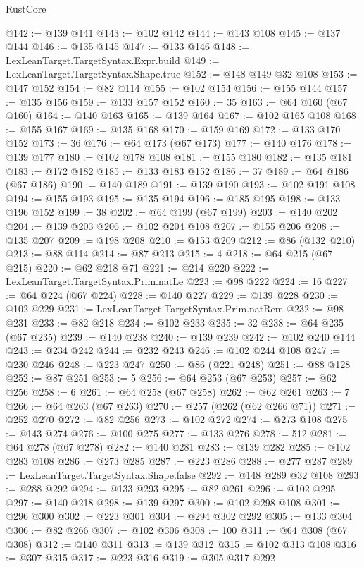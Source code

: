 \begin{lexlean}{RustCore}
\begin{coremodule}
@142 := @139 @141
@143 := @102 @142
@144 := @143 @108
@145 := @137 @144
@146 := @135 @145
@147 := @133 @146
@148 := LexLeanTarget.TargetSyntax.Expr.build
@149 := LexLeanTarget.TargetSyntax.Shape.true
@152 := @148 @149 @32 @108
@153 := @147 @152
@154 := @82 @114
@155 := @102 @154
@156 := @155 @144
@157 := @135 @156
@159 := @133 @157 @152
@160 := 35
@163 := @64 @160 (@67 @160)
@164 := @140 @163
@165 := @139 @164
@167 := @102 @165 @108
@168 := @155 @167
@169 := @135 @168
@170 := @159 @169
@172 := @133 @170 @152
@173 := 36
@176 := @64 @173 (@67 @173)
@177 := @140 @176
@178 := @139 @177
@180 := @102 @178 @108
@181 := @155 @180
@182 := @135 @181
@183 := @172 @182
@185 := @133 @183 @152
@186 := 37
@189 := @64 @186 (@67 @186)
@190 := @140 @189
@191 := @139 @190
@193 := @102 @191 @108
@194 := @155 @193
@195 := @135 @194
@196 := @185 @195
@198 := @133 @196 @152
@199 := 38
@202 := @64 @199 (@67 @199)
@203 := @140 @202
@204 := @139 @203
@206 := @102 @204 @108
@207 := @155 @206
@208 := @135 @207
@209 := @198 @208
@210 := @153 @209
@212 := @86 (@132 @210)
@213 := @88 @114
@214 := @87 @213
@215 := 4
@218 := @64 @215 (@67 @215)
@220 := @62 @218 @71
@221 := @214 @220
@222 := LexLeanTarget.TargetSyntax.Prim.natLe
@223 := @98 @222
@224 := 16
@227 := @64 @224 (@67 @224)
@228 := @140 @227
@229 := @139 @228
@230 := @102 @229
@231 := LexLeanTarget.TargetSyntax.Prim.natRem
@232 := @98 @231
@233 := @82 @218
@234 := @102 @233
@235 := 32
@238 := @64 @235 (@67 @235)
@239 := @140 @238
@240 := @139 @239
@242 := @102 @240 @144
@243 := @234 @242
@244 := @232 @243
@246 := @102 @244 @108
@247 := @230 @246
@248 := @223 @247
@250 := @86 (@221 @248)
@251 := @88 @128
@252 := @87 @251
@253 := 5
@256 := @64 @253 (@67 @253)
@257 := @62 @256
@258 := 6
@261 := @64 @258 (@67 @258)
@262 := @62 @261
@263 := 7
@266 := @64 @263 (@67 @263)
@270 := @257 (@262 (@62 @266 @71))
@271 := @252 @270
@272 := @82 @256
@273 := @102 @272
@274 := @273 @108
@275 := @143 @274
@276 := @100 @275
@277 := @133 @276
@278 := 512
@281 := @64 @278 (@67 @278)
@282 := @140 @281
@283 := @139 @282
@285 := @102 @283 @108
@286 := @273 @285
@287 := @223 @286
@288 := @277 @287
@289 := LexLeanTarget.TargetSyntax.Shape.false
@292 := @148 @289 @32 @108
@293 := @288 @292
@294 := @133 @293
@295 := @82 @261
@296 := @102 @295
@297 := @140 @218
@298 := @139 @297
@300 := @102 @298 @108
@301 := @296 @300
@302 := @223 @301
@304 := @294 @302 @292
@305 := @133 @304
@306 := @82 @266
@307 := @102 @306
@308 := 100
@311 := @64 @308 (@67 @308)
@312 := @140 @311
@313 := @139 @312
@315 := @102 @313 @108
@316 := @307 @315
@317 := @223 @316
@319 := @305 @317 @292

\end{coremodule}
\end{lexlean}
